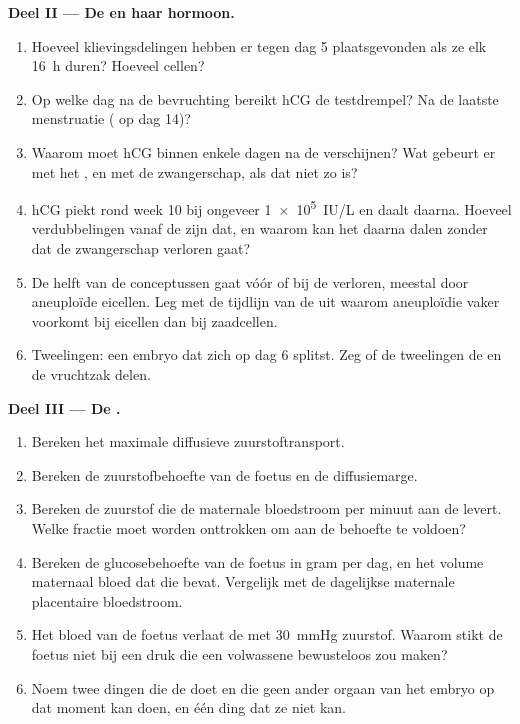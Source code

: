 \begin{problem}
\medskip
\noindent\textbf{Deel II --- De  en haar hormoon.}
\begin{enumerate}[resume]
  \item Hoeveel klievingsdelingen hebben er tegen dag 5 plaatsgevonden als
        ze elk \qty{16}{h} duren? Hoeveel cellen?
  \item Op welke dag na de bevruchting bereikt hCG de testdrempel? Na de
        laatste menstruatie ( op dag 14)?
  \item Waarom moet hCG binnen enkele dagen na de  verschijnen?
        Wat gebeurt er met het , en met de zwangerschap, als
        dat niet zo is?
  \item hCG piekt rond week 10 bij ongeveer \qty{1e5}{IU/L} en daalt
        daarna. Hoeveel verdubbelingen vanaf de  zijn dat, en
        waarom kan het daarna dalen zonder dat de zwangerschap verloren
        gaat?
  \item De helft van de conceptussen gaat vóór of bij de 
        verloren, meestal door aneuploïde eicellen. Leg met de tijdlijn van
        de  uit waarom aneuploïdie vaker voorkomt bij eicellen dan
        bij zaadcellen.
  \item Tweelingen: een embryo dat zich op dag 6 splitst. Zeg of de
        tweelingen de  en de vruchtzak delen.
\end{enumerate}

\medskip
\noindent\textbf{Deel III --- De .}
\begin{enumerate}[resume]
  \item Bereken het maximale diffusieve zuurstoftransport.
  \item Bereken de zuurstofbehoefte van de foetus en de diffusiemarge.
  \item Bereken de zuurstof die de maternale bloedstroom per minuut aan de
         levert. Welke fractie moet worden onttrokken om aan de
        behoefte te voldoen?
  \item Bereken de glucosebehoefte van de foetus in gram per dag, en het
        volume maternaal bloed dat die bevat. Vergelijk met de dagelijkse
        maternale placentaire bloedstroom.
  \item Het bloed van de foetus verlaat de  met \qty{30}{mmHg}
        zuurstof. Waarom stikt de foetus niet bij een druk die een
        volwassene bewusteloos zou maken?
  \item Noem twee dingen die de  doet en die geen ander orgaan van
        het embryo op dat moment kan doen, en één ding dat ze niet kan.
\end{enumerate}


\end{problem}
